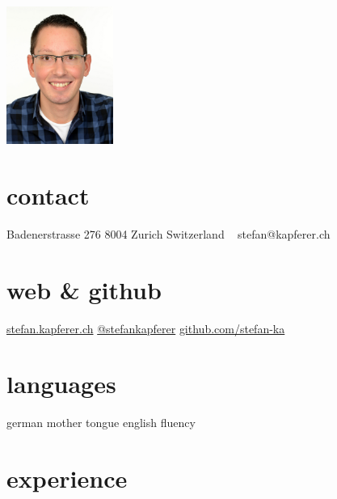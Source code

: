 \documentclass[]{cv-style}
\begin{document}


\begin{aside}
\includegraphics[width=3.5cm]{ska}
%
\section{contact}
Badenerstrasse 276
8004 Zurich
Switzerland
~
stefan@kapferer.ch
%
\section{web \& github}
\href{https://stefan.kapferer.ch}{stefan.kapferer.ch}
\href{https://twitter.com/stefankapferer}{@stefankapferer}
\href{https://github.com/stefan-ka}{github.com/stefan-ka}
%
\section{languages}
german mother tongue
english fluency
%
\end{aside}


\section{experience}
\end{document}

